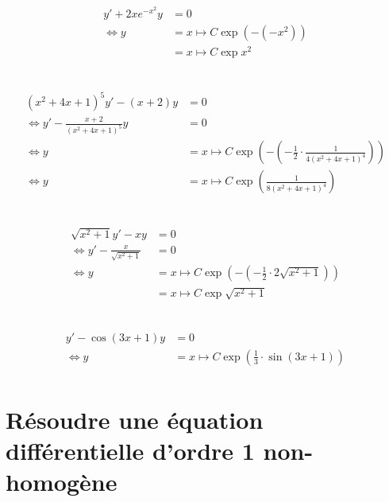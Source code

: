 \documentclass{article}
\begin{document}
\subsection{}

\begin{align*}
	y' + 2xe^{-x^2}y &= 0 \\
	\iff y &= x \mapsto C \exp (-(-x^2)) \\
	    &= x \mapsto C \exp x^2 \\
\end{align*}

\subsection{}
\begin{align*}
	(x^2+4x+1)^{5}y' - (x+2)y &= 0 \\
	\iff y' - \frac{x+2}{(x^2+4x+1)^{5}}y &= 0 \\
	\iff y &= x \mapsto C\exp \left( -\left(-\frac{1}{2}\cdot \frac{1}{4(x^2+4x+1)^{4}}\right)  \right)  \\
	\iff y&= x \mapsto C \exp\left( \frac{1}{8(x^2+4x+1)^{4}} \right)  \\
\end{align*}

\subsection{}
\begin{align*}
	\sqrt{x^2+1} y' - xy &= 0 \\
	\iff y' - \frac{x}{\sqrt{x^2+1} } &= 0 \\
	\iff y &= x \mapsto C\exp(-(-\frac{1}{2}\cdot 2\sqrt{x^2+1}))  \\
	       &= x \mapsto C\exp \sqrt{x^2+1} \\
\end{align*}

\subsection{}
\begin{align*}
	y'-\cos(3x+1)y&= 0 \\
	\iff y &= x\mapsto C\exp\left(\frac{1}{3} \cdot \sin(3x+1)\right) \\
\end{align*}

\section{Résoudre une équation différentielle d'ordre 1 non-homogène}
\end{document}

